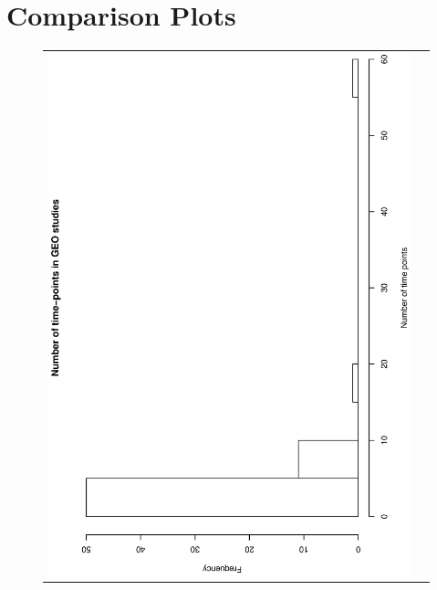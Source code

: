 \documentclass[a4paper]{article}
\date{}
\begin{document}
\section{Comparison Plots}

\begin{figure}[h!]
\centering
\begin{tabular}{cc}
\includegraphics[scale=0.5,angle=270]{GEO1.eps}\\

\end{tabular}
\end{figure}
\end{document}
